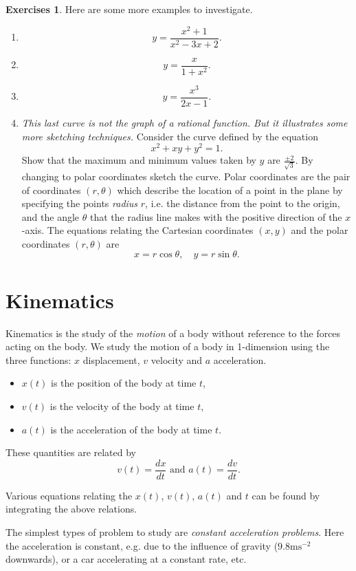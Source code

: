 \documentclass[extrafontsizes, twoside, a4paper]{memoir}
\theoremstyle{plain}%
\theoremstyle{definition}
\newtheorem{exer}{Exercises}[chapter]
\theoremstyle{remark}
\begin{document}
\begin{exer}
Here are some more examples to investigate.
\begin{enumerate}
\item
$$y = \frac{x^2 + 1}{x^2 - 3x + 2}.$$
\item
$$y=\frac{x}{1+x^2}.$$
\item
$$y=\frac{x^3}{2x-1}.$$
\item
\textit{This last curve is not the graph of a rational function. But it illustrates some more sketching techniques.}
Consider the curve defined by the equation
$$x^2 + xy + y^2 = 1.$$
Show that the maximum and minimum values taken by $y$ are $\frac{\pm 2}{\sqrt{3}}$. By changing to polar coordinates sketch the curve. Polar coordinates are the pair of coordinates $(r,\theta)$ which describe the location of a point in the plane by specifying the points \textit{radius} $r$, i.e. the distance from the point to the origin, and the angle $\theta$ that the radius line makes with the positive direction of the $x$-axis. The equations relating the Cartesian coordinates $(x,y)$ and the polar coordinates $(r, \theta)$ are
$$x=r \cos{\theta} , \quad y = r \sin{\theta} .$$
\end{enumerate}
\end{exer}

\section{Kinematics}

Kinematics is the study of the \textit{motion} of a body without reference to the forces acting on the body. We study the motion of a body in 1-dimension using the three functions: $x$ displacement, $v$ velocity and $a$ acceleration.

\begin{itemize}
\item
$x(t)$ is the position of the body at time $t$,
\item
$v(t)$ is the velocity of the body at time $t$,
\item
$a(t)$ is the acceleration of the body at time $t$.
\end{itemize}

These quantities are related by
$$ v(t) = \frac{dx}{dt} \text{ and } a(t)=\frac{dv}{dt}.$$

Various equations relating the $x(t)$, $v(t)$, $a(t)$ and $t$ can be found by integrating the above relations.

The simplest types of problem to study are \textit{constant acceleration problems}. Here the acceleration is constant, e.g. due to the influence of gravity ($9.8\text{ms}^{-2}$ downwards), or a car accelerating at a constant rate, etc.
\end{document}
